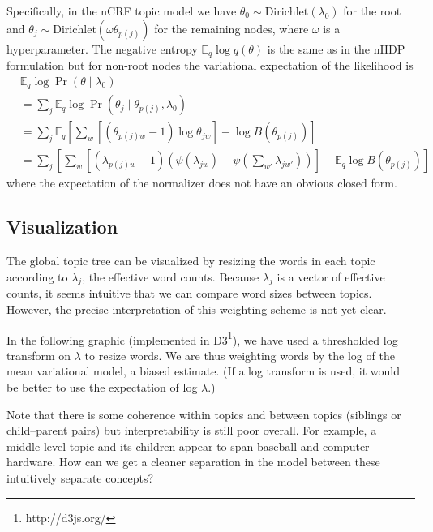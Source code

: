\documentclass{article}
\newcommand{\Dirichlet}{\ensuremath{\mathrm{Dirichlet}}}
\newcommand{\digamma}[1]{\ensuremath{\psi\left(#1\right)}}
\newcommand{\Elogdirichlet}[2]{\ensuremath{\digamma{#1} - \digamma{#2}}}
\newcommand{\Eq}{\ensuremath{\mathbb{E}_q\xspace}}
\newcommand{\parent}[1]{\ensuremath{p\left(#1\right)}}
\begin{document}
Specifically, in the nCRF topic model we have $\theta_0 \sim \Dirichlet\left(\lambda_0\right)$ for the root and $\theta_j \sim \Dirichlet\left(\omega \theta_{\parent{j}}\right)$ for the remaining nodes, where $\omega$ is a hyperparameter.  The negative entropy $\Eq \log q\left(\theta\right)$ is the same as in the nHDP formulation but for non-root nodes the variational expectation of the likelihood is
\begin{align*}
    &\Eq \log \Pr\left(\theta \mid \lambda_0\right) \\
    &= \sum_j \Eq \log \Pr\left(\theta_j \mid \theta_{\parent{j}}, \lambda_0\right) \\
    &= \sum_j \Eq \left[ \sum_w \left[ (\theta_{\parent{j} w} - 1) \log \theta_{jw} \right] - \log B\left(\theta_{\parent{j}}\right) \right] \\
    &= \sum_j \left[
        \sum_w \left[ (\lambda_{\parent{j} w} - 1) \left( \Elogdirichlet{\lambda_{jw}}{\sum_{w'}{\lambda_{jw'}}} \right) \right]
        - \Eq \log B\left(\theta_{\parent{j}}\right)
    \right]
\end{align*}
where the expectation of the normalizer does not have an obvious closed form.


\subsection*{Visualization}

The global topic tree can be visualized by resizing the words in each topic according to $\lambda_j$, the effective word counts.  Because $\lambda_j$ is a vector of effective counts, it seems intuitive that we can compare word sizes between topics.  However, the precise interpretation of this weighting scheme is not yet clear.

In the following graphic (implemented in D3\footnote{http://d3js.org/}), we have used a thresholded log transform on $\lambda$ to resize words.  We are thus weighting words by the log of the mean variational model, a biased estimate.  (If a log transform is used, it would be better to use the expectation of log $\lambda$.)

Note that there is some coherence within topics and between topics (siblings or child--parent pairs) but interpretability is still poor overall.  For example, a middle-level topic and its children appear to span baseball and computer hardware.  How can we get a cleaner separation in the model between these intuitively separate concepts?


\end{document}
